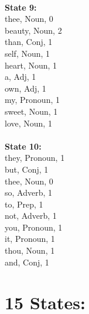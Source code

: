 \begin{multicols}{4}
\\
\textbf{State 9:} \\
thee, Noun, 0\\
beauty, Noun, 2\\
than, Conj, 1\\
self, Noun, 1\\
heart, Noun, 1\\
a, Adj, 1\\
own, Adj, 1\\
my, Pronoun, 1\\
sweet, Noun, 1\\
love, Noun, 1\\
\\
\textbf{State 10:} \\
they, Pronoun, 1\\
but, Conj, 1\\
thee, Noun, 0\\
so, Adverb, 1\\
to, Prep, 1\\
not, Adverb, 1\\
you, Pronoun, 1\\
it, Pronoun, 1\\
thou, Noun, 1\\
and, Conj, 1\\

\section{\textbf{15 States:}}


\end{multicols}
